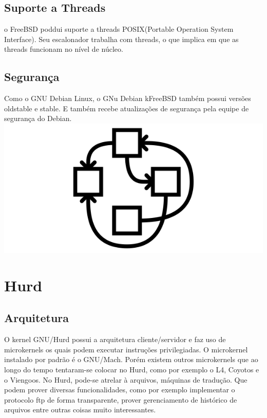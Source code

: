 \documentclass[conference]{IEEEtran}
\begin{document}
\subsection{Suporte a Threads}\label{sec:BSDThreads}
o FreeBSD poddui suporte a threads POSIX(Portable Operation System Interface). Seu escalonador trabalha com threads, o que implica em que as threads funcionam no nível de núcleo.\cite{DesignImplementationFreeBSD}

\subsection{Segurança}\label{sec:BSDSec}
Como o GNU Debian Linux, o GNu Debian kFreeBSD também possui versões oldstable e stable. E também recebe atualizações de segurança pela equipe de segurança do Debian.\cite{DebiankFreeBSDVersions}\\

\includegraphics[scale = 0.5]{Hurd.png}\\
\section{Hurd}\label{sec:Hurd}

\subsection{Arquitetura}\label{sec:HurdArq}
O kernel GNU/Hurd possui a arquitetura cliente/servidor e faz uso de microkernels os quais podem executar instruções privilegiadas. O microkernel instalado por padrão é o GNU/Mach. Porém existem outros microkernels que ao longo do tempo tentaram-se colocar no Hurd, como por exemplo o L4, Coyotos e o Viengoos. No Hurd, pode-se atrelar à arquivos, máquinas de tradução. Que podem prover diversas funcionalidades, como por exemplo implementar o protocolo ftp de forma transparente, prover gerenciamento de histórico de arquivos entre outras coisas muito interessantes.\cite{HurdPaper}
\end{document}
